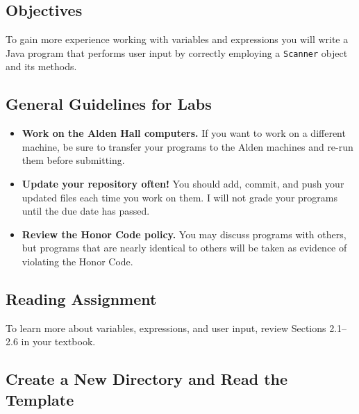 


\vspace{-0.275in}
\subsection*{Objectives}

To gain more experience working with variables and expressions you will write a Java program that performs user input by
correctly employing a {\tt Scanner} object and its methods.

\vspace{-0.15in}
\subsection*{General Guidelines for Labs}
\begin{itemize}
\item
{\bf Work on the Alden Hall computers.} If you want to work on a different
machine, be sure to transfer your programs to the Alden
machines and re-run them before submitting.
\item
{\bf Update your repository often!} You should add, commit,
and push your updated files each time you work on them.  I will not grade
your programs until the due date has passed.
\item
{\bf Review the Honor Code policy.} You
may discuss programs with others, but programs that are nearly identical
to others will be taken as evidence of violating the Honor Code.
\end{itemize}

\vspace{-0.25in}
\subsection*{Reading Assignment}

To learn more about variables, expressions, and user input, review Sections 2.1--2.6 in your textbook.

\vspace{-0.15in}
\subsection*{Create a New Directory and Read the Template}

